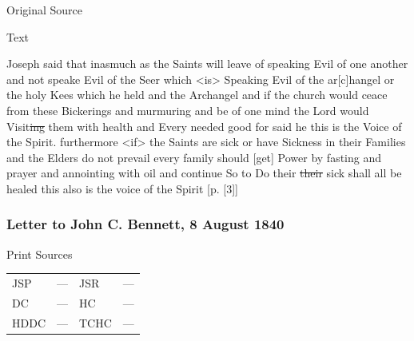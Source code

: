 			\begin{description}
				\item[Original Source]
			\end{description}
			
			
			\begin{description}
				\item[Text]
			\end{description}
			
				Joseph said that inasmuch as the Saints will leave of speaking Evil of one another and not speake Evil of the Seer which <is> Speaking Evil of the ar[c]hangel or the holy Kees which he held and the Archangel and if the church would ceace from these Bickerings and murmuring and be of one mind the Lord would Visit\sout{ing} them with health and Every needed good for said he this is the Voice of the Spirit. furthermore <if> the Saints are sick or have Sickness in their Families and the Elders do not prevail every family should [get] Power by fasting and prayer and annointing with oil and continue So to Do their \sout{their} sick shall all be healed this also is the voice of the Spirit [p. [3]]
				
		\subsubsection{Letter to John C. Bennett, 8 August 1840}
			\label{EMS-1840-JS-8-AUG-1840}
			
			\begin{description}
				\item[Print Sources]
			\end{description}

			\begin{tabular}{p{0.5in}p{1in}p{0.5in}p{1in}}
				JSP	 	& ---		& JSR 		& --- \\
				DC	 	& ---		& HC 		& --- \\
				HDDC 	& ---		& TCHC 		& --- \\
			\end{tabular}
			
